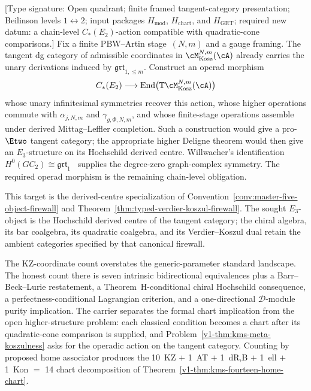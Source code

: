 \begin{problem}
\label{v1-thm:kms-meta-koszulness}
\ClaimStatusOpen
\textup{[Type signature: Open quadrant; finite framed tangent-category
presentation; Beilinson levels $1\leftrightarrow2$; input packages
$H_{\mathrm{mod}}$, $H_{\mathrm{chart}}$, and
$H_{\mathrm{GRT}}$; required new datum: a chain-level
$C_*(E_2)$-action compatible with quadratic-cone comparisons.]}
Fix a finite PBW--Artin stage~$(N,m)$ and a gauge framing. The
tangent dg category of admissible coordinates in
$\cM_{\mathrm{Kosz}}^{N,m}(\cA)$ already carries the unary
derivations induced by $\mathfrak{grt}_{1,\le m}$.  Construct an
operad morphism
\[
 C_*(E_2)\longrightarrow
 \operatorname{End}\bigl(\mathbb T
 \cM_{\mathrm{Kosz}}^{N,m}(\cA)\bigr)
\]
whose unary infinitesimal symmetries recover this action, whose
higher operations commute with
$\alpha_{j,N,m}$ and $\gamma_{g,\Phi,N,m}$, and whose finite-stage
operations assemble under derived Mittag--Leffler completion.
Such a construction would give a pro-$\Etwo$ tangent category; the
appropriate higher Deligne theorem would then give an $E_3$-structure
on its Hochschild derived centre.  Willwacher's identification
$H^0(GC_2)\cong\mathfrak{grt}_1$~\cite{Willwacher15} supplies the
degree-zero graph-complex symmetry.  The required operad morphism is
the remaining chain-level obligation.

This target is the derived-centre specialization of
Convention~\ref{conv:master-five-object-firewall} and
Theorem~\ref{thm:typed-verdier-koszul-firewall}.  The sought
$E_3$-object is the Hochschild derived centre of the tangent
category; the chiral algebra, its bar coalgebra, its quadratic
coalgebra, and its Verdier--Koszul dual retain the ambient categories
specified by that canonical firewall.
\end{problem}

\begin{remark}
\label{v1-rem:kms-fm198-closed}
The KZ-coordinate count overstates the generic-parameter
standard landscape. The honest count there is seven
intrinsic bidirectional equivalences plus a
Barr--Beck--Lurie restatement, a Theorem~H-conditional chiral
Hochschild consequence, a perfectness-conditional Lagrangian criterion, and
a one-directional $\mathcal{D}$-module purity implication.  The
carrier separates the formal chart implication from the open
higher-structure problem: each classical condition becomes a chart
after its quadratic-cone comparison is supplied, and
Problem~\ref{v1-thm:kms-meta-koszulness} asks for the operadic action
on the tangent category. Counting by proposed home associator produces the
10~KZ $+$ 1~AT $+$ 1~dR,B $+$ 1~ell $+$ 1~Kon $=$ 14 chart
decomposition of
Theorem~\ref{v1-thm:kms-fourteen-home-chart}.
\end{remark}


